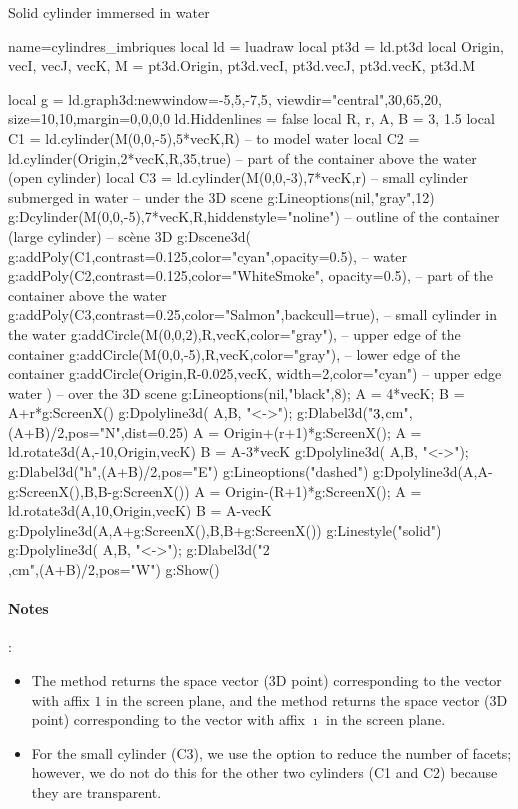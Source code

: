 \begin{demo}{Solid cylinder immersed in water}
\begin{luadraw}{name=cylindres_imbriques}
local ld = luadraw
local pt3d = ld.pt3d
local Origin, vecI, vecJ, vecK, M = pt3d.Origin, pt3d.vecI, pt3d.vecJ, pt3d.vecK, pt3d.M

local g = ld.graph3d:new{window={-5,5,-7,5}, viewdir={"central",30,65,20},
    size={10,10},margin={0,0,0,0}}
ld.Hiddenlines = false
local R, r, A, B = 3, 1.5
local C1 = ld.cylinder(M(0,0,-5),5*vecK,R)  -- to model water
local C2 = ld.cylinder(Origin,2*vecK,R,35,true) -- part of the container above the water (open cylinder)
local C3 = ld.cylinder(M(0,0,-3),7*vecK,r) -- small cylinder submerged in water
-- under the 3D scene
g:Lineoptions(nil,"gray",12)
g:Dcylinder(M(0,0,-5),7*vecK,R,{hiddenstyle="noline"}) -- outline of the container (large cylinder)
-- scène 3D
g:Dscene3d(
        g:addPoly(C1,{contrast=0.125,color="cyan",opacity=0.5}), -- water
        g:addPoly(C2,{contrast=0.125,color="WhiteSmoke", opacity=0.5}), -- part of the container above the water
        g:addPoly(C3,{contrast=0.25,color="Salmon",backcull=true}), -- small cylinder in the water
        g:addCircle(M(0,0,2),R,vecK,{color="gray"}), -- upper edge of the container
        g:addCircle(M(0,0,-5),R,vecK,{color="gray"}), -- lower edge of the container
        g:addCircle(Origin,R-0.025,vecK, {width=2,color="cyan"}) -- upper edge water
        )
-- over the 3D scene
g:Lineoptions(nil,"black",8); A = 4*vecK; B = A+r*g:ScreenX()
g:Dpolyline3d( {A,B}, "<->"); g:Dlabel3d("$3\\,$cm",(A+B)/2,{pos="N",dist=0.25})
A = Origin+(r+1)*g:ScreenX(); A = ld.rotate3d(A,-10,{Origin,vecK})
B = A-3*vecK
g:Dpolyline3d( {A,B}, "<->"); g:Dlabel3d("h",(A+B)/2,{pos="E"})
g:Lineoptions("dashed")
g:Dpolyline3d({{A,A-g:ScreenX()},{B,B-g:ScreenX()}})
A = Origin-(R+1)*g:ScreenX(); A = ld.rotate3d(A,10,{Origin,vecK})
B = A-vecK
g:Dpolyline3d({{A,A+g:ScreenX()},{B,B+g:ScreenX()}})
g:Linestyle("solid")
g:Dpolyline3d( {A,B}, "<->"); g:Dlabel3d("$2$\\,cm",(A+B)/2,{pos="W"})
g:Show()
\end{luadraw}
\end{demo}

\paragraph{Notes}:
\begin{itemize}
    \item The  method returns the space vector (3D point) corresponding to the vector with affix $1$ in the screen plane, and the  method returns the space vector (3D point) corresponding to the vector with affix $\imath$ in the screen plane.
    \item For the small cylinder (C3), we use the  option to reduce the number of facets; however, we do not do this for the other two cylinders (C1 and C2) because they are transparent.
\end{itemize}

